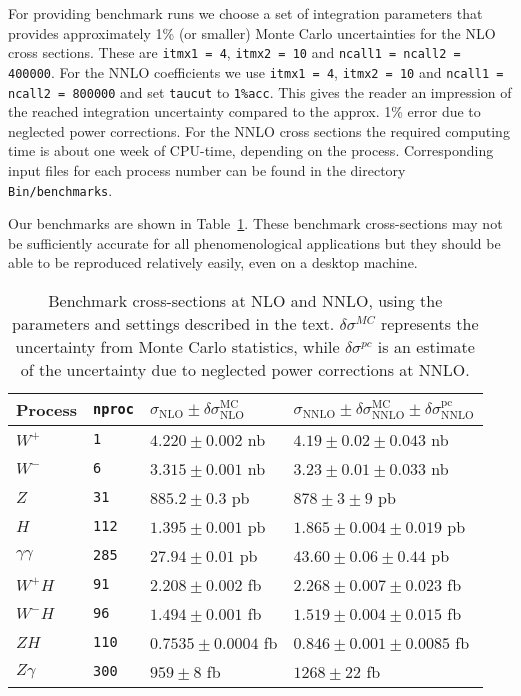 \documentclass{article}
\begin{document}
For providing benchmark runs we choose a set of integration parameters
that provides approximately 1\% (or smaller) Monte Carlo uncertainties for the NLO cross sections.
These are {\tt itmx1 = 4}, {\tt itmx2 = 10} and {\tt ncall1 = ncall2 = 400000}.
For the NNLO coefficients we use {\tt itmx1 = 4}, {\tt itmx2 = 10} and {\tt ncall1 = ncall2 = 800000} and 
set {\tt taucut} to {\tt 1\%acc}. This gives the reader an impression of the reached integration uncertainty 
compared to the approx. 1\% error due to neglected power corrections. For the NNLO cross sections the 
required computing time is about one week of CPU-time, depending on the process. Corresponding input files 
for each process number can be found in the directory {\tt Bin/benchmarks}.

Our benchmarks are shown in Table~\ref{NNLObenchmarks}.  These benchmark cross-sections
may not be sufficiently accurate for all phenomenological applications but they should
be able to be reproduced relatively easily, even on a desktop machine.

\begin{table}
\begin{center}
\begin{tabular}{|l|l|l|l|} \hline
Process & {\tt nproc} & $\sigma_\mathrm{NLO} \pm \delta\sigma_\mathrm{NLO}^\mathrm{MC} $ & 
$\sigma_\mathrm{NNLO} \pm 
\delta\sigma_\mathrm{NNLO}^\mathrm{MC} \pm \delta\sigma_\mathrm{NNLO}^\mathrm{pc}$ \\ 
\hline
$W^+$ & {\tt 1}    & $4.220 \pm 0.002$ nb & $4.19 \pm 0.02 \pm 0.043$ nb\\
$W^-$ & {\tt 6}    & $3.315 \pm 0.001$ nb & $3.23 \pm 0.01 \pm 0.033$ nb\\
$Z  $ & {\tt 31}   & $885.2 \pm 0.3$ pb & $878 \pm 3 \pm 9$ pb\\
$H  $ & {\tt 112}  & $1.395 \pm 0.001$ pb & $1.865 \pm 0.004 \pm 0.019$ pb\\
$\gamma\gamma  $ & {\tt 285}  & $27.94 \pm 0.01$ pb & $43.60 \pm 0.06 \pm 0.44$ pb\\
$W^+H$ & {\tt 91}    & $2.208 \pm 0.002$ fb & $2.268 \pm 0.007 \pm 0.023$ fb\\
$W^-H$ & {\tt 96}    & $1.494 \pm 0.001$ fb & $1.519 \pm 0.004 \pm 0.015$ fb\\
$ZH$   & {\tt 110}   & $0.7535 \pm 0.0004$ fb & $0.846 \pm 0.001 \pm 0.0085$ fb\\
$Z\gamma$ & {\tt 300} & $959 \pm 8$ fb & $1268 \pm 22 $ fb \\
\hline
\end{tabular}
\caption{Benchmark cross-sections at NLO and NNLO, using the parameters
and settings described in the text.  $\delta\sigma^{MC}$ represents the uncertainty
from Monte Carlo statistics, while $\delta\sigma^{pc}$ is an estimate of the
uncertainty due to neglected power corrections at NNLO.}
\label{NNLObenchmarks} 
\end{center}
\end{table}
\end{document}
